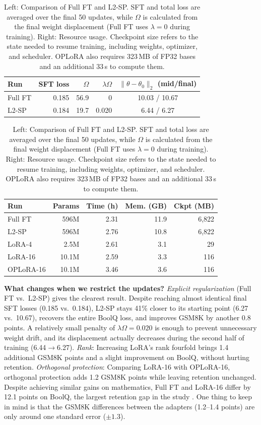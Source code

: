 \documentclass{article}
\begin{document}
\begin{table}[t]
\caption{Left: Comparison of Full FT and L2-SP. SFT and total loss are averaged over the final 50 updates, while $\Omega$ is calculated from the final weight displacement (Full FT uses $\lambda=0$ during training). Right: Resource usage. Checkpoint size refers to the state needed to resume training, including weights, optimizer, and scheduler. OPLoRA also requires 323\,MB of FP32 bases and an additional 33\,s to compute them.}
\label{tab:t1reg}
\centering
\footnotesize
\begin{tabular}{lrrrc}
\toprule
Run & SFT loss & $\Omega$ & $\lambda\Omega$ & $\|\theta-\theta_0\|_2$ (mid/final) \\
\midrule
Full FT & 0.185 & 56.9 & 0 & 10.03 / 10.67 \\
L2-SP & 0.184 & 19.7 & 0.020 & 6.44 / 6.27 \\
\bottomrule
\end{tabular}
\hfill
\begin{tabular}{lrrrr}
\toprule
Run & Params & Time (h) & Mem. (GB) & Ckpt (MB) \\
\midrule
Full FT & 596M & 2.31 & 11.9 & 6,822 \\
L2-SP & 596M & 2.76 & 10.8 & 6,822 \\
LoRA-4 & 2.5M & 2.61 & 3.1 & 29 \\
LoRA-16 & 10.1M & 2.59 & 3.3 & 116 \\
OPLoRA-16 & 10.1M & 3.46 & 3.6 & 116 \\
\bottomrule
\end{tabular}
\end{table}

\textbf{What changes when we restrict the updates?} \emph{Explicit regularization} (Full FT vs.\ L2-SP) gives the clearest result. Despite reaching almost identical final SFT losses (0.185 vs.\ 0.184), L2-SP stays 41\% closer to its starting point (6.27 vs.\ 10.67), recovers the entire BoolQ loss, and improves GSM8K by another 0.8 points. A relatively small penalty of $\lambda\Omega=0.020$ is enough to prevent unnecessary weight drift, and its displacement actually decreases during the second half of training (6.44$\to$6.27). \emph{Rank}: Increasing LoRA's rank fourfold brings 1.4 additional GSM8K points and a slight improvement on BoolQ, without hurting retention. \emph{Orthogonal protection}: Comparing LoRA-16 with OPLoRA-16, orthogonal protection adds 1.2 GSM8K points while leaving retention unchanged. Despite achieving similar gains on mathematics, Full FT and LoRA-16 differ by 12.1 points on BoolQ, the largest retention gap in the study \citep{biderman2024lora}. One thing to keep in mind is that the GSM8K differences between the adapters (1.2--1.4 points) are only around one standard error ($\pm1.3$).
\end{document}
